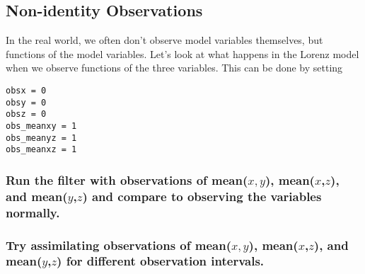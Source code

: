 \subsection{Non-identity Observations}

In the real world, we often don't observe model variables themselves, but functions of the model variables.  
Let's look at what happens in the Lorenz model when we observe  functions of the three variables.  
This can be done by 
setting 
\begin{verbatim}
obsx = 0
obsy = 0
obsz = 0
obs_meanxy = 1
obs_meanyz = 1
obs_meanxz = 1
\end{verbatim}

\subsubsection{Run the filter with observations of mean($x,y$), mean($x$,$z$), and mean($y$,$z$) and compare to observing the variables normally.}
\subsubsection{Try assimilating observations of mean($x,y$), mean($x$,$z$), and mean($y$,$z$) for different observation intervals.}
%

